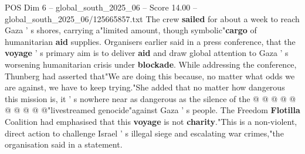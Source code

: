 \begin{textsample}{POS Dim 6 – global\_south\_2025\_06 – Score 14.00 – global\_south\_2025\_06/125665857.txt}
The crew \textbf{sailed} for about a week to reach Gaza ' s shores, carrying a"limited amount, though symbolic"\textbf{cargo} of humanitarian \textbf{aid} supplies.
Organisers earlier said in a press conference, that the \textbf{voyage} ' s primary aim is to deliver \textbf{aid} and draw global attention to Gaza ' s worsening humanitarian crisis under \textbf{blockade}.
While addressing the conference, Thunberg had asserted that"We are doing this because, no matter what odds we are against, we have to keep trying."She added that no matter how dangerous this mission is, it ' s nowhere near as dangerous as the silence of the @ @ @ @ @ @ @ @ @ @"livestreamed genocide"against Gaza ' s people.
The Freedom \textbf{Flotilla} Coalition had emphasised that this \textbf{voyage} is not \textbf{charity}."This is a non-violent, direct action to challenge Israel ' s illegal siege and escalating war crimes,"the organisation said in a statement.

\end{textsample}
